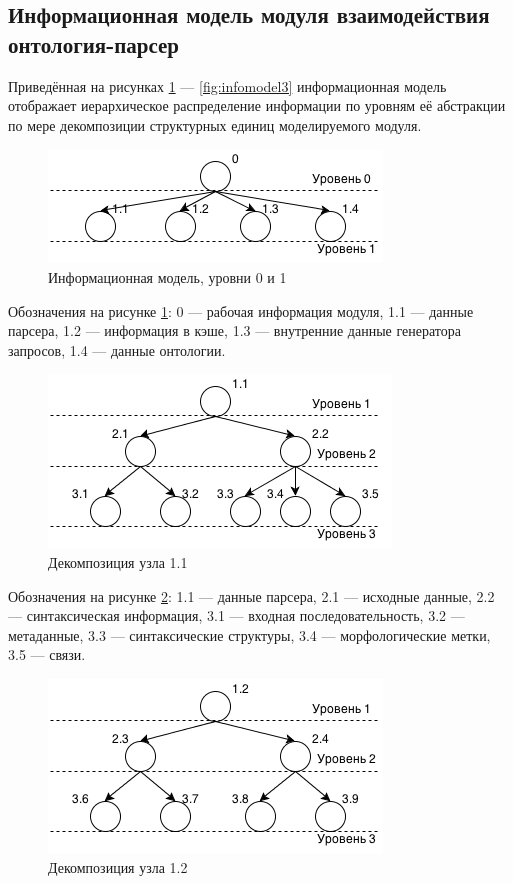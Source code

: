 \subsection{Информационная модель модуля взаимодействия онтология-парсер}

Приведённая на рисунках \ref{fig:infomodel0} --- \ref{fig:infomodel3} информационная модель отображает иерархическое распределение информации по уровням её абстракции по мере декомпозиции структурных единиц моделируемого модуля.

\begin{figure}[H]
	\centering
		\includegraphics[scale=1.0]{images/infomodel0.png}
	\caption{\small Информационная модель, уровни 0 и 1}
	\label{fig:infomodel0}
\end{figure}

Обозначения на рисунке \ref{fig:infomodel0}: 0 --- рабочая информация модуля, 1.1 --- данные парсера, 1.2 --- информация в кэше, 1.3 --- внутренние данные генератора запросов, 1.4 --- данные онтологии.

\begin{figure}[H]
	\centering
		\includegraphics[scale=1.0]{images/infomodel1.png}
	\caption{\small Декомпозиция узла 1.1}
	\label{fig:infomodel1}
\end{figure}

Обозначения на рисунке \ref{fig:infomodel1}: 1.1 --- данные парсера, 2.1 --- исходные данные, 2.2 --- синтаксическая информация, 3.1 --- входная последовательность, 3.2 --- метаданные, 3.3 --- синтаксические структуры, 3.4 --- морфологические метки, 3.5 --- связи.

\begin{figure}[H]
	\centering
		\includegraphics[scale=1.0]{images/infomodel2.png}
	\caption{\small Декомпозиция узла 1.2}
	\label{fig:infomodel2}
\end{figure}


